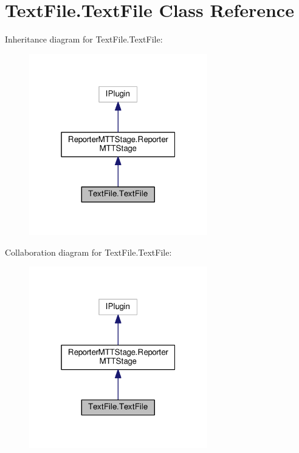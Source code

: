 \hypertarget{class_text_file_1_1_text_file}{\section{Text\-File.\-Text\-File Class Reference}
\label{class_text_file_1_1_text_file}
}


Inheritance diagram for Text\-File.\-Text\-File\-:
\nopagebreak
\begin{figure}[H]
\begin{center}
\leavevmode
\includegraphics[width=220pt]{class_text_file_1_1_text_file__inherit__graph}
\end{center}
\end{figure}


Collaboration diagram for Text\-File.\-Text\-File\-:
\nopagebreak
\begin{figure}[H]
\begin{center}
\leavevmode
\includegraphics[width=220pt]{class_text_file_1_1_text_file__coll__graph}
\end{center}
\end{figure}
